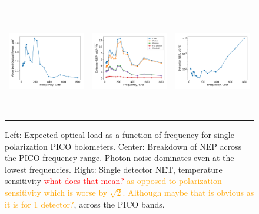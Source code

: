 \documentclass[]{spie}  %
\newcommand{\comr}[1]{\textcolor{red}{#1}}
\newcommand{\como}[1]{\textcolor{orange}{#1}}
\begin{document}
\begin{figure} [ht]
\begin{center}
\begin{tabular}{ccc} %
\hspace{-1.4cm} \includegraphics[height=4.9cm]{system_Popt.png} & \hspace{-0.7cm} \includegraphics[height=4.9cm]{system_NEP.png} &\hspace{-0.7cm}  \includegraphics[height=4.9cm]{system_NET.png} 
\end{tabular}
\end{center}
\caption{ \label{fig:popt} \label{fig:noise} \label{fig:net} 
Left: Expected optical load as a function of frequency for single polarization PICO bolometers. 
Center: Breakdown of NEP across the PICO frequency range.  Photon noise dominates even at the lowest frequencies. 
Right: Single detector NET, temperature sensitivity \comr{what does that mean?} \como{as opposed to polarization sensitivity which is worse by $\sqrt{2}$.
Although maybe that is obvious as it is for 1 detector?}, across the PICO bands. 
}
\end{figure} 
\end{document}
